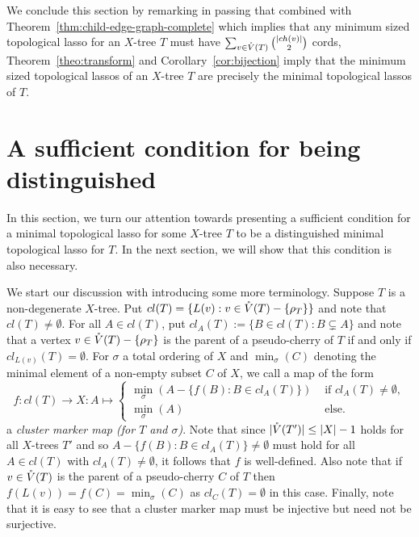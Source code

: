 We conclude this section by remarking in passing that combined with
Theorem~\ref{thm:child-edge-graph-complete} which implies that any minimum
sized topological lasso for an $X$-tree $T$ must have $\sum_{v\in
  \mathring{V}(T)}{|ch(v)|\choose 2}$ cords, Theorem~\ref{theo:transform} and
Corollary~\ref{cor:bijection} imply that the minimum sized topological lassos
of an $X$-tree $T$ are precisely the minimal topological lassos of $T$.
 
\section{A sufficient condition for being distinguished}
\label{sec:sufficient}
In this section, we turn our attention towards presenting a sufficient
condition for a minimal topological lasso for some $X$-tree $T$ to be a
distinguished minimal topological lasso for $T$.  In the next section, we will
show that this condition is also necessary.

We start our discussion with introducing some more terminology.  Suppose $T$
is a non-degenerate $X$-tree. Put $cl(T)=\{L(v): v\in \mathring{V}(T)-\{\rho_T\}\}$ and
note that $cl(T)\not=\emptyset$. For all $A\in cl(T)$, put $cl_A(T):=\{B\in
cl(T): B\subsetneq A\}$ and note that a vertex $v\in \mathring{V}(T)-\{\rho_T\}$ is the
parent of a pseudo-cherry of $T$ if and only if $cl_{L(v)}(T)=\emptyset$.  For
$\sigma$ a total ordering of $X$ and $\min_{\sigma}(C)$ denoting the minimal
element of a non-empty subset $C$ of $X$, we call a map of the form
$$
f:cl(T)\to X:
A\mapsto \left\{\begin{array}{cc}
\min_{\sigma}(A-\{f(B): B\in cl_A(T)\})
 & \mbox{ if }cl_A(T)\not=\emptyset,\\
\min_{\sigma}(A)  & \mbox{ else. }
\end{array}
\right.
$$ 
a {\em cluster marker map (for $T$ and $\sigma$)}.  Note that since
$|\mathring{V}(T')|\leq |X|-1$ holds for all $X$-trees $T'$ and so $A-\{f(B): B\in
cl_A(T)\}\not=\emptyset$ must hold for all $A\in cl(T)$ with
$cl_A(T)\not=\emptyset $, it follows that $f$ is well-defined.  Also note that
if $v\in \mathring{V}(T)$ is the parent of a pseudo-cherry $C$ of $T$ then
$f(L(v))=f(C)= \min_{\sigma}(C)$ as $cl_C(T)=\emptyset$ in this case. Finally,
note that it is easy to see that a cluster marker map must be injective but
need not be surjective.


